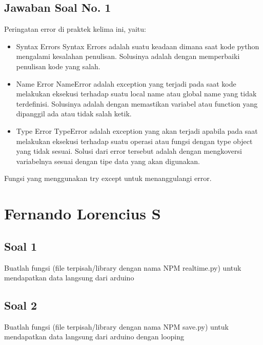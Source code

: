 \subsection{Jawaban Soal No. 1}
\hfill \break
Peringatan error di praktek kelima ini, yaitu:
\begin{itemize}
	\item Syntax Errors
	Syntax Errors adalah suatu keadaan dimana saat kode python mengalami kesalahan penulisan. Solusinya adalah dengan memperbaiki penulisan kode yang salah.
	\item Name Error
	NameError adalah exception yang terjadi pada saat kode melakukan eksekusi terhadap suatu local name atau global name yang tidak terdefinisi. Solusinya adalah dengan memastikan variabel atau function yang dipanggil ada atau tidak salah ketik.
	\item Type Error
	TypeError adalah exception yang akan terjadi apabila pada saat melakukan eksekusi terhadap suatu operasi atau fungsi dengan type object yang tidak sesuai. Solusi dari error tersebut adalah dengan mengkoversi variabelnya sesuai dengan tipe data yang akan digunakan.
\end{itemize}
\hfill \break
Fungsi yang menggunakan try except untuk menanggulangi error.


\section{Fernando Lorencius S}
\subsection{Soal 1}
Buatlah fungsi (file terpisah/library dengan nama NPM realtime.py) untuk mendapatkan data langsung dari arduino



\subsection{Soal 2}
Buatlah fungsi (file terpisah/library dengan nama NPM save.py) untuk mendapatkan data langsung dari arduino dengan looping



